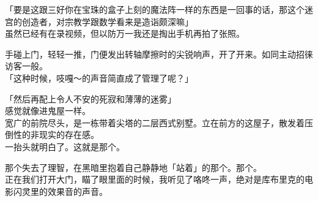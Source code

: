 「要是这跟三好你在宝珠的盒子上刻的魔法阵一样的东西是一回事的话，那这个迷宫的创造者，对宗教学跟数学看来是造诣颇深嘛」\\

虽然已经有在录视频，但以防万一我还是掏出手机再拍了张照。

手碰上门，轻轻一推，门便发出转轴摩擦时的尖锐响声，开了开来。如同主动招徕访客一般。\\

「这种时候，吱嘎～的声音简直成了管理了呢？」

「然后再配上令人不安的死寂和薄薄的迷雾」\\

感觉就像进鬼屋一样。\\

宽广的前院尽头，是一栋带着尖塔的二层西式别墅。立在前方的这屋子，散发着压倒性的非现实的存在感。\\

一抬头就明白了。这就是那个。

那个失去了理智，在黑暗里抱着自己静静地「站着」的那个。那个。\\

正在我们打开大门，瞄了眼里面的时候，我听见了咯咚一声，绝对是库布里克的电影闪灵里的效果音的声音。\\

